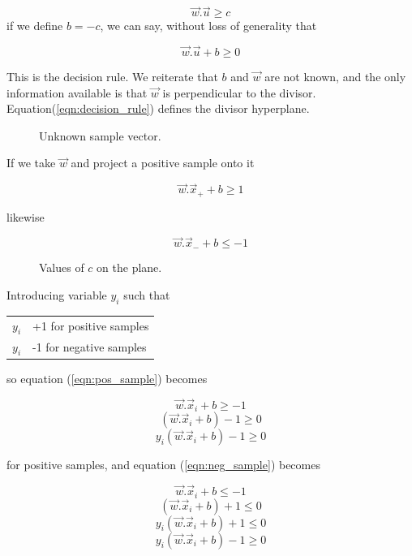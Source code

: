 \documentclass[]{article}
\begin{document}
\[
\vec{w} . \vec{u} \geq c
\]
if we define $b=-c$, we can say, without loss of generality that

\begin{equation}
\label{eqn:decision_rule}
\vec{w}.\vec{u} + b \geq 0
\end{equation}

This is the decision rule. We reiterate that $b$ and $\vec{w}$ are not known, and the only information available is that $\vec{w}$ is perpendicular to the divisor. Equation(\ref{eqn:decision_rule}) defines the divisor hyperplane.

\begin{figure}[h]
	\centering
	
	\caption{Unknown sample vector.}
	\label{fig:fig6}
\end{figure}

If we take $\vec{w}$ and project a positive sample onto it

\begin{equation}
\label{eqn:pos_sample}
\vec{w}.\vec{x}_{+} + b \geq 1
\end{equation}

likewise

\begin{equation}
\label{eqn:neg_sample}
\vec{w}.\vec{x}_{-} + b \leq -1
\end{equation}


\begin{figure}[h]
	\centering
	
	\caption{Values of $c$ on the plane.}
	\label{fig:fig7}
\end{figure}


Introducing variable $y_i$ such that

\begin{tabular}{ll}
	$y_i$ & +1 for positive samples \\
	$y_i$ & -1 for negative samples \\
\end{tabular}

\bigskip
so equation (\ref{eqn:pos_sample}) becomes

\[
\vec{w}.\vec{x}_{i} + b \geq -1
\]
\[
(\vec{w}.\vec{x}_{i} + b) -1 \geq 0
\]
\[
y_i(\vec{w}.\vec{x}_{i} + b)-1 \geq 0
\]

for positive samples, and equation (\ref{eqn:neg_sample}) becomes

\[
\vec{w}.\vec{x}_{i} + b \leq -1
\]
\[
(\vec{w}.\vec{x}_{i} + b)  + 1 \leq 0
\]
\[
y_i(\vec{w}.\vec{x}_{i} + b)+1 \leq 0
\]
\[
y_i(\vec{w}.\vec{x}_{i} + b)-1 \geq 0
\]
\end{document}
